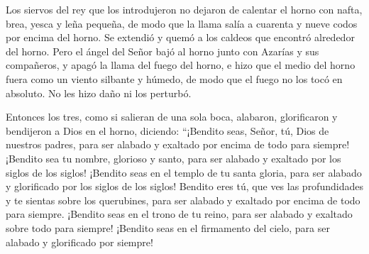  Los siervos del rey que los introdujeron no dejaron de
calentar el horno con nafta, brea, yesca y leña pequeña, 
de modo que la llama salía a cuarenta y nueve codos por encima del
horno.  Se extendió y quemó a los caldeos que encontró
alrededor del horno.  Pero el ángel del Señor bajó al
horno junto con Azarías y sus compañeros, y apagó la llama del fuego del
horno,  e hizo que el medio del horno fuera como un
viento silbante y húmedo, de modo que el fuego no los tocó en absoluto.
No les hizo daño ni los perturbó.

 Entonces los tres, como si salieran de una sola boca,
alabaron, glorificaron y bendijeron a Dios en el horno, diciendo:
 ``¡Bendito seas, Señor, tú, Dios de nuestros padres,
para ser alabado y exaltado por encima de todo para siempre!
 ¡Bendito sea tu nombre, glorioso y santo, para ser
alabado y exaltado por los siglos de los siglos! 
¡Bendito seas en el templo de tu santa gloria, para ser alabado y
glorificado por los siglos de los siglos!  Bendito eres
tú, que ves las profundidades y te sientas sobre los querubines, para
ser alabado y exaltado por encima de todo para siempre. 
¡Bendito seas en el trono de tu reino, para ser alabado y exaltado sobre
todo para siempre!  ¡Bendito seas en el firmamento del
cielo, para ser alabado y glorificado por siempre!

